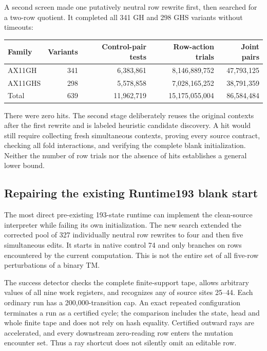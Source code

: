 \documentclass[10pt,a4paper]{article}
\begin{document}
A second screen made one putatively neutral row rewrite first, then
searched for a two-row quotient. It completed all 341 GH and 298 GHS
variants without timeouts:
\begin{center}\small
\begin{tabular}{lrrrr}
\toprule
Family & Variants & Control-pair tests & Row-action trials & Joint pairs\\
\midrule
AX11GH & 341 & 6,383,861 & 8,146,889,752 & 47,793,125\\
AX11GHS & 298 & 5,578,858 & 7,028,165,252 & 38,791,359\\
\midrule
Total & 639 & 11,962,719 & 15,175,055,004 & 86,584,484\\
\bottomrule
\end{tabular}
\end{center}

There were zero hits. The second stage deliberately reuses the original
contexts after the first rewrite and is labeled heuristic candidate
discovery. A hit would still require collecting fresh simultaneous
contexts, proving every source contract, checking all fold interactions,
and verifying the complete blank initialization. Neither the number of
row trials nor the absence of hits establishes a general lower bound.

\subsection{Repairing the existing Runtime193 blank start}

The most direct pre-existing 193-state runtime can implement the
clean-source interpreter while failing its own initialization. The
new search extended the corrected pool of 327 individually neutral
row rewrites to four and then five simultaneous edits. It starts in
native control 74 and only branches on rows encountered by the
current computation. This is not the entire set of all five-row
perturbations of a binary TM.

The success detector checks the complete finite-support tape, allows
arbitrary values of all nine work registers, and recognizes any of
source sites 25--44. Each ordinary run has a 200,000-transition cap.
An exact repeated configuration terminates a run as a certified cycle;
the comparison includes the state, head and whole finite tape and
does not rely on hash equality. Certified outward rays are accelerated,
and every downstream zero-reading row enters the mutation encounter
set. Thus a ray shortcut does not silently omit an editable row.
\end{document}
